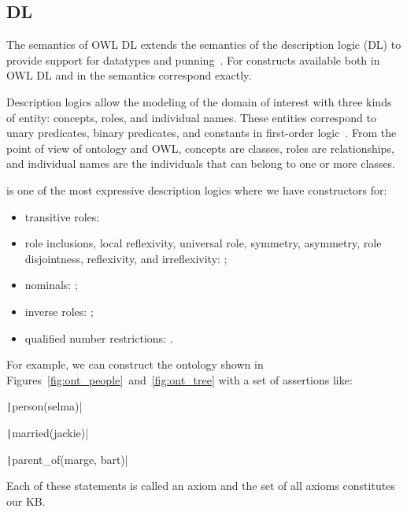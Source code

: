 \subsection{ DL}
The semantics of OWL DL extends the semantics of the description logic (DL)  to provide support for datatypes and punning~\cite{w3c_2012_owl_dl}. For constructs available both in OWL DL and in  the semantics correspond exactly.

Description logics allow the modeling of the domain of interest with three kinds of entity: concepts, roles, and individual names. These entities correspond to unary predicates, binary predicates, and constants in first-order logic~\cite{krotzsch2012description}. From the point of view of ontology and OWL, concepts are classes, roles are relationships, and individual names are the individuals that can belong to one or more classes.

 is one of the most expressive description logics where we have constructors for:
\begin{itemize}
	\item transitive roles: 
	\item role inclusions, local reflexivity, universal role, symmetry, asymmetry, role disjointness, reflexivity, and irreflexivity: ;
	\item nominals: ;
	\item inverse roles: ;
	\item qualified number restrictions: .
\end{itemize}

For example, we can construct the ontology shown in Figures~\ref{fig:ont_people}~and~\ref{fig:ont_tree} with a set of assertions like:\\
\begin{minipage}{\linewidth}
	\hspace{.5cm}
	\begin{minipage}{.27\linewidth}
		\texttt|person(selma)|
	\end{minipage}
	\begin{minipage}{.3\linewidth}
		\texttt|married(jackie)|
	\end{minipage}
	\begin{minipage}{.2\linewidth}
		\texttt|parent_of(marge, bart)|
	\end{minipage}
\end{minipage}
Each of these statements is called an axiom and the set of all axioms constitutes our KB.

